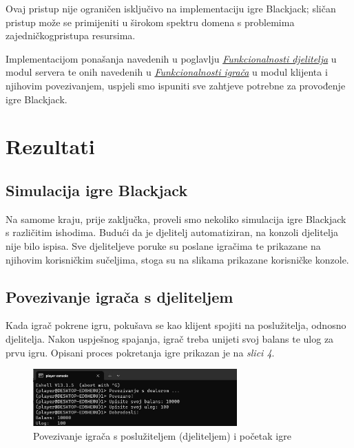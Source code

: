 \documentclass[conference]{IEEEtran}
\begin{document}
Ovaj pristup nije ograničen isključivo na implementaciju igre Blackjack; sličan pristup može se primijeniti u širokom spektru domena s problemima zajedničkog\break pristupa resursima. 

Implementacijom ponašanja navedenih u poglavlju \hyperref[sec:djelitelj]{\textit{Funkcionalnosti djelitelja}} u modul servera te onih navedenih u \hyperref[sec:igrac]{\textit{Funkcionalnosti igrača}} u modul klijenta i njihovim povezivanjem, uspjeli smo ispuniti sve zahtjeve potrebne za provođenje igre Blackjack.




\section{Rezultati}

\subsection{Simulacija igre Blackjack}

Na samome kraju, prije zaključka, proveli smo nekoliko simulacija igre Blackjack s različitim ishodima. Budući da je djelitelj automatiziran, na konzoli djelitelja nije bilo ispisa. Sve djeliteljeve poruke su poslane igračima te prikazane na njihovim korisničkim sučeljima, stoga su na slikama prikazane korisničke konzole.

\subsection{Povezivanje igrača s djeliteljem}

Kada igrač pokrene igru, pokušava se kao klijent spojiti na poslužitelja, odnosno djelitelja. Nakon uspješnog spajanja, igrač treba unijeti svoj balans te ulog za prvu igru. Opisani proces pokretanja igre prikazan je na \textit{slici 4}.

\begin{figure}[H]
\centerline{\includegraphics[width=18.5pc]{1.jpeg}}
\caption{Povezivanje igrača s poslužiteljem (djeliteljem) i početak igre}
\vspace*{-5pt}
\end{figure}
\end{document}
